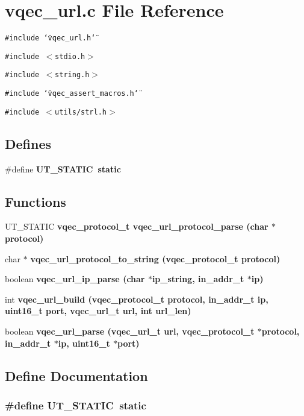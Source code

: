 \section{vqec\_\-url.c File Reference}
\label{vqec__url_8c}
{\tt \#include \char`\"{}vqec\_\-url.h\char`\"{}}\par
{\tt \#include $<$stdio.h$>$}\par
{\tt \#include $<$string.h$>$}\par
{\tt \#include \char`\"{}vqec\_\-assert\_\-macros.h\char`\"{}}\par
{\tt \#include $<$utils/strl.h$>$}\par
\subsection*{Defines}
\begin{CompactItemize}
\item 
\#define \bf{UT\_\-STATIC}~static
\end{CompactItemize}
\subsection*{Functions}
\begin{CompactItemize}
\item 
UT\_\-STATIC \bf{vqec\_\-protocol\_\-t} \bf{vqec\_\-url\_\-protocol\_\-parse} (char $\ast$protocol)
\item 
char $\ast$ \bf{vqec\_\-url\_\-protocol\_\-to\_\-string} (\bf{vqec\_\-protocol\_\-t} protocol)
\item 
boolean \bf{vqec\_\-url\_\-ip\_\-parse} (char $\ast$ip\_\-string, in\_\-addr\_\-t $\ast$ip)
\item 
int \bf{vqec\_\-url\_\-build} (\bf{vqec\_\-protocol\_\-t} protocol, in\_\-addr\_\-t ip, uint16\_\-t port, \bf{vqec\_\-url\_\-t} url, int url\_\-len)
\item 
boolean \bf{vqec\_\-url\_\-parse} (\bf{vqec\_\-url\_\-t} url, \bf{vqec\_\-protocol\_\-t} $\ast$protocol, in\_\-addr\_\-t $\ast$ip, uint16\_\-t $\ast$port)
\end{CompactItemize}


\subsection{Define Documentation}
\subsubsection{\setlength{\rightskip}{0pt plus 5cm}\#define UT\_\-STATIC~static}\label{vqec__url_8c_840be0a802b42af3ce4430a7173caa40}




